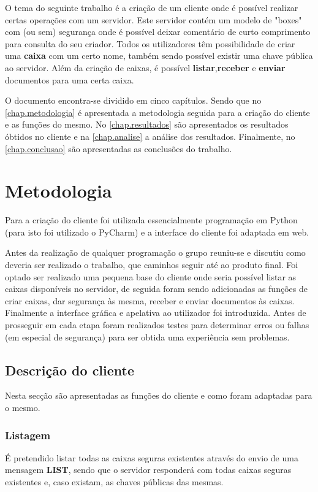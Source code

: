 \documentclass{report}
\begin{document}
O tema do seguinte trabalho é a criação de um cliente onde é possível realizar certas operações com um servidor.
Este servidor contém um modelo de "boxes" com (ou sem) segurança onde é possível deixar comentário de curto comprimento para consulta do seu criador. Todos os utilizadores têm possibilidade de criar uma \textbf{caixa} com um certo nome, também sendo possível existir uma chave pública ao servidor. Além da criação de caixas, é possível \textbf{listar},\textbf{receber} e \textbf{enviar} documentos para uma certa caixa.

O documento encontra-se dividido em cinco capítulos.
Sendo que no \autoref{chap.metodologia} é apresentada a metodologia seguida para a criação do cliente e
as funções do mesmo.
No \autoref{chap.resultados} são apresentados os resultados óbtidos no cliente e na \autoref{chap.analise} a análise dos resultados.
Finalmente, no \autoref{chap.conclusao} são apresentadas
as conclusões do trabalho.

\chapter{Metodologia}
\label{chap.metodologia}

Para a criação do cliente foi utilizada essencialmente programação em Python (para isto foi utilizado o PyCharm) e a interface do cliente foi adaptada em web.

Antes da realização de qualquer programação o grupo reuniu-se e discutiu como deveria ser realizado o trabalho, que caminhos seguir até ao produto final. Foi optado ser realizado uma pequena base do cliente onde seria possível listar as caixas disponíveis no servidor, de seguida foram sendo adicionadas as funções de criar caixas, dar segurança às mesma, receber e enviar documentos às caixas. Finalmente a interface gráfica e apelativa ao utilizador foi introduzida. Antes de prosseguir em cada etapa foram realizados testes para determinar erros ou falhas (em especial de segurança) para ser obtida uma experiência sem problemas.

\section{Descrição do cliente}
\label{subs.desc}
Nesta secção são apresentadas as funções do cliente e como foram adaptadas para o mesmo.

\subsection{Listagem}
É pretendido listar todas as caixas seguras existentes através do envio de uma mensagem \textbf{LIST}, sendo que o servidor responderá com todas caixas seguras existentes e, caso existam, as chaves públicas das mesmas.
\end{document}
